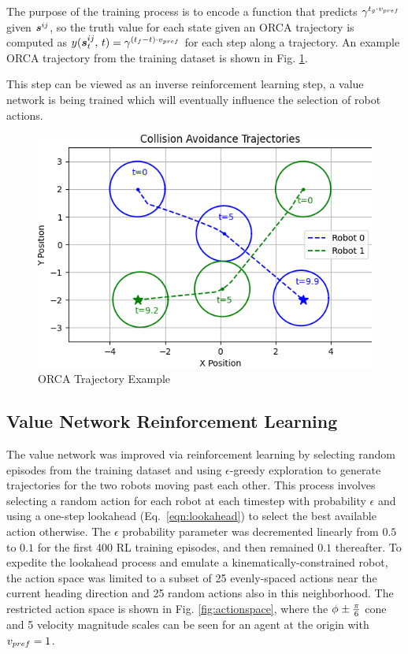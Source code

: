 \documentclass[conference]{IEEEtran}
\begin{document}

The purpose of the training process is to encode a function that predicts $\gamma{}^{t_g\cdot v_{pref}}$ given $\boldsymbol{s}^{ij}_{}$, so the truth value for each state given an ORCA trajectory is computed as $y(\boldsymbol{s}^{ij}_{t}, \, t)=\gamma{}^{(t_{f}-t)\cdot v_{pref}}$ for each step along a trajectory. An example ORCA trajectory from the training dataset is shown in Fig. \ref{fig:ORCA}.

This step can be viewed as an inverse reinforcement learning step, a value network is being trained which will eventually influence the selection of robot actions.
\begin{figure}[h!]
    \centering
    \includegraphics[width=0.9\linewidth]{docs/latex/figures/ORCA_Example_1.png}
    \caption{ORCA Trajectory Example}
    \label{fig:ORCA}
\end{figure}

\subsection{Value Network Reinforcement Learning}
The value network was improved via reinforcement learning by selecting random episodes from the training dataset and using $\epsilon$-greedy exploration to generate trajectories for the two robots moving past each other. This process involves selecting a random action for each robot at each timestep with probability $\epsilon$ and using a one-step lookahead (Eq.~\ref{eqn:lookahead}) to select the best available action otherwise. The $\epsilon$ probability parameter was decremented linearly from $0.5$ to $0.1$ for the first 400 RL training episodes, and then remained $0.1$ thereafter. To expedite the lookahead process and emulate a kinematically-constrained robot, the action space was limited to a subset of 25 evenly-spaced actions near the current heading direction and 25 random actions also in this neighborhood. The restricted action space is shown in Fig. \ref{fig:actionspace}, where the $\phi_{}\pm\frac{\pi}{6}$ cone and 5 velocity magnitude scales can be seen for an agent at the origin with $v_{pref}=1$.
\end{document}
